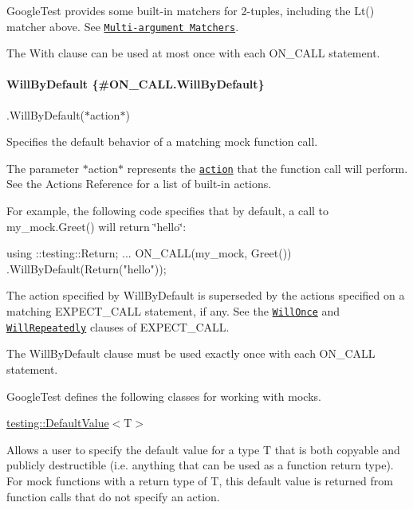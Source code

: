 Google\+Test provides some built-\/in matchers for 2-\/tuples, including the {\ttfamily Lt()} matcher above. See \href{matchers.md#MultiArgMatchers}{\tt Multi-\/argument Matchers}.

The {\ttfamily With} clause can be used at most once with each {\ttfamily O\+N\+\_\+\+C\+A\+LL} statement.

\paragraph*{Will\+By\+Default \{\#\+O\+N\+\_\+\+C\+A\+L\+L.\+Will\+By\+Default\}}

{\ttfamily .Will\+By\+Default(}$\ast${\ttfamily action}$\ast${\ttfamily )}

Specifies the default behavior of a matching mock function call.

The parameter $\ast${\ttfamily action}$\ast$ represents the \href{../gmock_for_dummies.md#actions-what-should-it-do}{\tt action} that the function call will perform. See the Actions Reference for a list of built-\/in actions.

For example, the following code specifies that by default, a call to {\ttfamily my\+\_\+mock.\+Greet()} will return {\ttfamily \char`\"{}hello\char`\"{}}\+:


\begin{DoxyCode}
using ::testing::Return;
...
ON\_CALL(my\_mock, Greet())
    .WillByDefault(Return(\textcolor{stringliteral}{"hello"}));
\end{DoxyCode}


The action specified by {\ttfamily Will\+By\+Default} is superseded by the actions specified on a matching {\ttfamily E\+X\+P\+E\+C\+T\+\_\+\+C\+A\+LL} statement, if any. See the \href{#EXPECT_CALL.WillOnce}{\tt {\ttfamily Will\+Once}} and \href{#EXPECT_CALL.WillRepeatedly}{\tt {\ttfamily Will\+Repeatedly}} clauses of {\ttfamily E\+X\+P\+E\+C\+T\+\_\+\+C\+A\+LL}.

The {\ttfamily Will\+By\+Default} clause must be used exactly once with each {\ttfamily O\+N\+\_\+\+C\+A\+LL} statement.

Google\+Test defines the following classes for working with mocks.

{\ttfamily \mbox{\hyperlink{classtesting_1_1DefaultValue}{testing\+::\+Default\+Value}}$<$T$>$}

Allows a user to specify the default value for a type {\ttfamily T} that is both copyable and publicly destructible (i.\+e. anything that can be used as a function return type). For mock functions with a return type of {\ttfamily T}, this default value is returned from function calls that do not specify an action.

